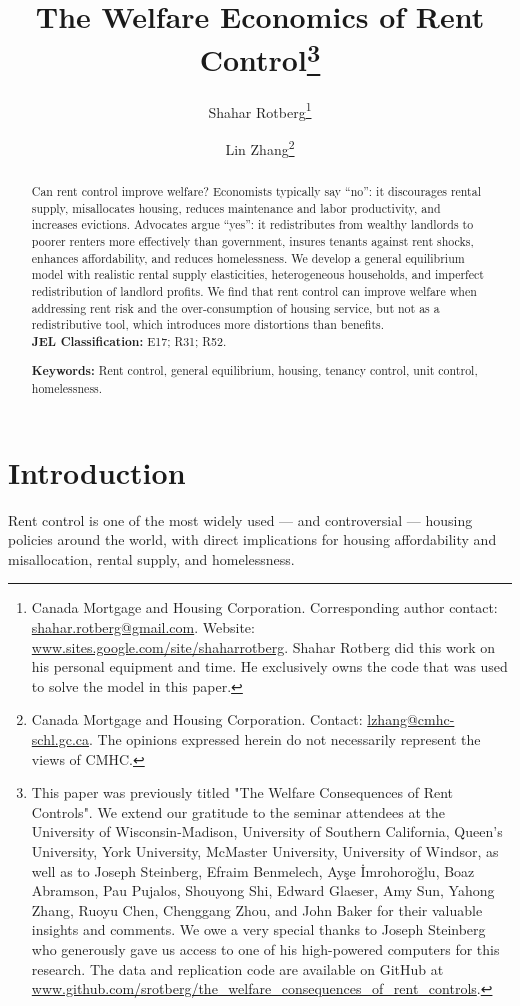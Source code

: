 \documentclass[parskip=full]{article}
\title{\vspace{-1.8cm}The Welfare Economics of Rent Control\footnote{This paper was previously titled "The Welfare Consequences of Rent Controls". We extend our gratitude to the seminar attendees at the University of Wisconsin-Madison, University of Southern California, Queen's University, York University, McMaster University, University of Windsor, as well as to Joseph Steinberg, Efraim Benmelech, Ay\c{s}e \.{I}mrohoro\u{g}lu, Boaz Abramson, Pau Pujalos, Shouyong Shi, Edward Glaeser, Amy Sun, Yahong Zhang, Ruoyu Chen, Chenggang Zhou, and John Baker for their valuable insights and comments. We owe a very special thanks to Joseph Steinberg who generously gave us access to one of his high-powered computers for this research. The data and replication code are available on GitHub at \url{www.github.com/srotberg/the_welfare_consequences_of_rent_controls}.}}
\author{Shahar Rotberg\footnote{Canada Mortgage and Housing Corporation. Corresponding author contact: \url{shahar.rotberg@gmail.com}. Website: \url{www.sites.google.com/site/shaharrotberg}. Shahar Rotberg did this work on his personal equipment and time. He exclusively owns the code that was used to solve the model in this paper.} \and Lin Zhang\footnote{Canada Mortgage and Housing Corporation. Contact: \url{lzhang@cmhc-schl.gc.ca}. The opinions expressed herein do not necessarily represent the views of CMHC.}}
\begin{document}
\maketitle

\begin{abstract}
\onehalfspacing
\noindent %

\noindent Can rent control improve welfare? Economists typically say “no”: it discourages rental supply, misallocates housing, reduces maintenance and labor productivity, and increases evictions. Advocates argue “yes”: it redistributes from wealthy landlords to poorer renters more effectively than government, insures tenants against rent shocks, enhances affordability, and reduces homelessness. We develop a general equilibrium model with realistic rental supply elasticities, heterogeneous households, and imperfect redistribution of landlord profits. We find that rent control can improve welfare when addressing rent risk and the over-consumption of housing service, but not as a redistributive tool, which introduces more distortions than benefits.
\\[1.5ex]

\noindent \textbf{JEL Classification:} E17; R31; R52. 

\noindent \textbf{Keywords:} Rent control, general equilibrium, housing, tenancy control, unit control, homelessness.
\end{abstract}

\section{Introduction}

Rent control is one of the most widely used — and controversial — housing policies around the world, with direct implications for housing affordability and misallocation, rental supply, and homelessness.
\end{document}
